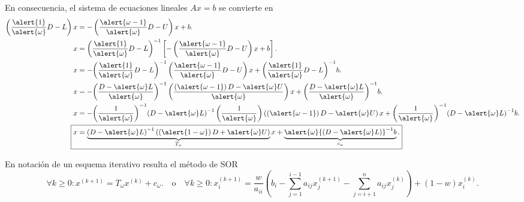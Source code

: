 \begin{frame}

	En consecuencia, el sistema de ecuaciones lineales $Ax=b$ se
	convierte en
	\begin{align}
		\left(
		\frac{\alert{1}}{\alert{\omega}}D-L
		\right)x
		 & =
		-\left(
		\frac{\alert{\omega-1}}{\alert{\omega}}D-U
		\right)x + b. \notag                                                    \\
		x
		 & =
		{\left(\frac{\alert{1}}{\alert{\omega}}D-L\right)}^{-1}
		\left[
			-\left(\frac{\alert{\omega-1}}{\alert{\omega}}D-U\right)x+
			b
		\right].                                                         \notag \\
		x
		 & =
		-{\left(\frac{\alert{1}}{\alert{\omega}}D-L\right)}^{-1}
		\left(\frac{\alert{\omega-1}}{\alert{\omega}}D-U\right)x+
		{\left(\frac{\alert{1}}{\alert{\omega}}D-L\right)}^{-1}
		b.                                                          \notag      \\
		x
		 & =
		-{\left(\frac{D-\alert{\omega}L}{\alert{\omega}}\right)}^{-1}
		\left(\frac{\left(\alert{\omega-1}\right)D-\alert{\omega}U}{\alert{\omega}}\right)x+
		{\left(\frac{D-\alert{\omega}L}{\alert{\omega}}\right)}^{-1}
		b.                                                \notag                \\
		x
		 & =
		-{\left(\frac{1}{\alert{\omega}}\right)}^{-1}{\left(D-\alert{\omega}L\right)}^{-1}
		\left(\frac{1}{\alert{\omega}}\right)\left(\left(\alert{\omega-1}\right)D-\alert{\omega}U\right)x+
		{\left(\frac{1}{\alert{\omega}}\right)}^{-1}{\left(D-\alert{\omega}L\right)}^{-1}
		b.                                                 \notag               \\
		\Aboxed{
		x
		 & =
		\underbrace{
			{\left(D-\alert{\omega}L\right)}^{-1}
			\left(\left(\alert{1-\omega}\right)D+\alert{\omega}U\right)
		}_{T_{\omega}}x+
		\underbrace{
			\alert{\omega}{\left(D-\alert{\omega}L\right)}^{-1}b
		}_{c_{\omega}}.
		}\label{eq:sor_iteration}
	\end{align}

	En notación de un esquema iterativo resulta el \alert{método de SOR}
	\begin{equation*}
		\boxed{
		\forall k\geq0\colon
		x^{\left(k+1\right)}=
		T_{\omega}x^{\left(k\right)}+
		c_{\omega}.
		}\quad\text{o}\quad
		\boxed{
		\forall k\geq0\colon
		x_{i}^{\left(k+1\right)}=
		\frac{w}{a_{ii}}
		\left(
		b_{i}-
		\sum_{j=1}^{i-1}a_{ij}x_j^{\left(k+1\right)}-
		\sum_{j=i+1}^{n}a_{ij}x_{j}^{\left(k\right)}\right)+
		\left(1-w\right)x_{i}^{\left(k\right)}.
		}
	\end{equation*}
\end{frame}

